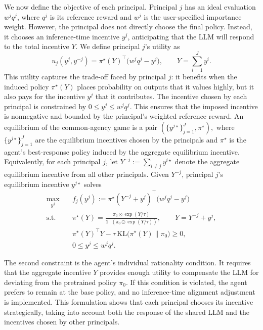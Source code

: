 \documentclass{article}
\begin{document}
We now define the objective of each principal. Principal \(j\) has an ideal evaluation \(w^j q^j\), where \(q^j\) is its reference reward and \(w^j\) is the user-specified importance weight. However, the principal does not directly choose the final policy. Instead, it chooses an inference-time incentive \(y^j\), anticipating that the LLM will respond to the total incentive \(Y\). We define principal \(j\)'s utility as
\[
u_j(y^j,y^{-j})
=
\pi^\star(Y)^\top \bigl(w^j q^j-y^j\bigr),
\qquad
Y=\sum_{i=1}^J y^i.
\]
This utility captures the trade-off faced by principal \(j\): it benefits when the induced policy \(\pi^\star(Y)\) places probability on outputs that it values highly, but it also pays for the incentive \(y^j\) that it contributes. 
The incentive chosen by each principal is constrained by
\(
0\le y^j \le w^j q^j.
\)
This ensures that the imposed incentive is nonnegative and bounded by the principal's weighted reference reward. 
An equilibrium of the common-agency game is a pair
\(
\left(\{y^{j\star}\}_{j=1}^J,\pi^\star\right),
\)
where \(\{y^{j\star}\}_{j=1}^J\) are the equilibrium incentives chosen by the principals and \(\pi^\star\) is the agent's best-response policy induced by the aggregate equilibrium incentive. 
Equivalently, for each principal \(j\), let
\(
Y^{-j}:=\sum_{i\neq j}y^{i\star}
\)
denote the aggregate equilibrium incentive from all other principals. Given \(Y^{-j}\), principal \(j\)'s equilibrium incentive \(y^{j\star}\) solves
\begin{equation}\label{Eq:optimization}
\begin{aligned}
\max_{y^j}\quad 
& f_j(y^j)
:=
\pi^\star(Y^{-j}+y^j)^\top
\bigl(w^j q^j-y^j\bigr) \\
\text{s.t.}\quad
& \pi^\star(Y)
=
\frac{\pi_0\odot \exp(Y/\tau)}
{\mathbf{1}^\top(\pi_0\odot \exp(Y/\tau))},
\qquad
Y=Y^{-j}+y^j,\\
& \pi^\star(Y)^\top Y
-
\tau\,\mathrm{KL}\bigl(\pi^\star(Y)\|\pi_0\bigr)
\ge 0,\\
& 0\le y^j\le w^j q^j.
\end{aligned}
\end{equation}

The second constraint is the agent's individual rationality condition. It requires that the aggregate incentive \(Y\) provides enough utility to compensate the LLM for deviating from the pretrained policy \(\pi_0\). If this condition is violated, the agent prefers to remain at the base policy, and no inference-time alignment adjustment is implemented.
This formulation shows that each principal chooses its incentive strategically, taking into account both the response of the shared LLM and the incentives chosen by other principals. 
\end{document}
